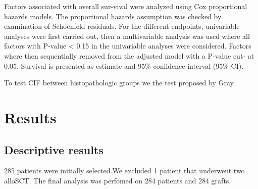\documentclass[a4paper,11pt] {article}
\begin{document}
Factors associated with overall sur-vival were analyzed using Cox proportional hazards models. The proportional hazards assumption was checked by examination of Schoenfeld residuals.
For the different endpoints, univariable analyses were first carried out, then a multivariable analysis was used where all factors with P-value < 0.15 in the univariable analyses were considered. Factors where then sequentially removed from the adjusted model with a P-value cut- at 0.05. 
Survival is presented as estimate and 95\% confidence interval (95\% CI).


To test CIF between histopathologic groups we the test proposed by Gray. 

\pagebreak[4]
\section{Results}





\subsection{Descriptive results}
 285 patients were initially selected.We excluded 1 patient that underwent two alloSCT. The final analysis was perfomed on 284 patients and 284 grafts.
\end{document}
